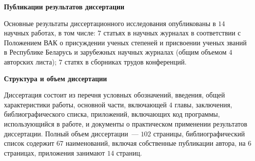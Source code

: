 \documentclass[_00_dissertation.tex]{subfiles}
\begin{document}
\begin{center}
\textbf{Публикации результатов диссертации}
\end{center}

Основные результаты диссертационного исследования опубликованы в $14$ научных работах, в том числе: $7$ статьях в научных журналах в соответствии с Положением ВАК о присуждении ученых степеней и присвоении ученых званий в Республике Беларусь и зарубежных научных журналах (общим объемом $4$ авторских листа); $7$ статях в сборниках трудов конференций.

\begin{center}
\textbf{Структура и объем диссертации}
\end{center}

Диссертация состоит из перечня условных обозначений, введения, общей характеристики работы, основной части, включающей $4$ главы, заключения, библиографического списка, приложений, включающих код программы, использующийся в работе, и документы о практическом применении результатов диссертации.
Полный объем диссертации~--- $102$ страницы, библиографический список содержит $67$ наименований, включая собственные публикации автора, на $6$ страницах, приложения занимают $14$ страниц.

\onlyinsubfile{
    
}
\end{document}
